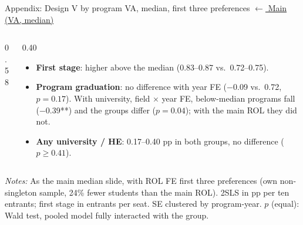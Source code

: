 \documentclass{beamer}
\begin{document}
\begin{frame}[label=d5-app-va-median-top3]{Appendix: Design V by program VA, median, first three preferences}
\vspace{-0.3cm}
\hyperlink{d5-va-median}{\tiny\color{blue}$\leftarrow$ Main (VA, median)}

\begin{columns}[T,onlytextwidth]
\begin{column}{0.58\textwidth}
\centering
\tiny
\resizebox{\linewidth}{!}{}
\end{column}
\begin{column}{0.40\textwidth}
\scriptsize
\begin{itemize}
    \setlength{\itemsep}{3pt}
    \item \textbf{First stage}: higher above the median (0.83--0.87 vs.\ 0.72--0.75).
    \item \textbf{Program graduation}: no difference with year FE ($-$0.09 vs.\ 0.72, $p=0.17$). With university, field $\times$ year FE, below-median programs fall ($-$0.39**) and the groups differ ($p=0.04$); with the main ROL they did not.
    \item \textbf{Any university / HE}: 0.17--0.40 pp in both groups, no difference ($p\geq0.41$).
\end{itemize}
\end{column}
\end{columns}

\vspace{0.05cm}
\parbox{0.97\textwidth}{\tiny \textit{Notes:} As the main median slide, with ROL FE first three preferences (own non-singleton sample, 24\% fewer students than the main ROL). 2SLS in pp per ten entrants; first stage in entrants per seat. SE clustered by program-year. $p$ (equal): Wald test, pooled model fully interacted with the group.}
\end{frame}
\end{document}
